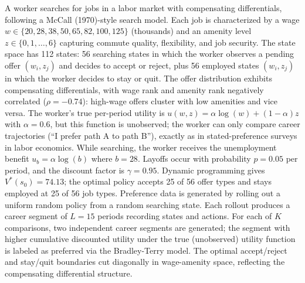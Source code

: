 A worker searches for jobs in a labor market with compensating differentials, following a McCall (1970)-style search model. Each job is characterized by a wage $w \in \{20, 28, 38, 50, 65, 82, 100, 125\}$ (thousands) and an amenity level $z \in \{0, 1, \ldots, 6\}$ capturing commute quality, flexibility, and job security. The state space has 112 states: 56 searching states in which the worker observes a pending offer $(w_i, z_j)$ and decides to accept or reject, plus 56 employed states $(w_i, z_j)$ in which the worker decides to stay or quit. The offer distribution exhibits compensating differentials, with wage rank and amenity rank negatively correlated ($\rho = -0.74$): high-wage offers cluster with low amenities and vice versa. The worker's true per-period utility is $u(w, z) = \alpha \log(w) + (1 - \alpha) z$ with $\alpha = 0.6$, but this function is unobserved; the worker can only compare career trajectories (``I prefer path A to path B''), exactly as in stated-preference surveys in labor economics. While searching, the worker receives the unemployment benefit $u_b = \alpha \log(b)$ where $b = 28$. Layoffs occur with probability $p = 0.05$ per period, and the discount factor is $\gamma = 0.95$. Dynamic programming gives $V^*(s_0) = 74.13$; the optimal policy accepts 25 of 56 offer types and stays employed at 25 of 56 job types. Preference data is generated by rolling out a uniform random policy from a random searching state. Each rollout produces a career segment of $L = 15$ periods recording states and actions. For each of $K$ comparisons, two independent career segments are generated; the segment with higher cumulative discounted utility under the true (unobserved) utility function is labeled as preferred via the Bradley-Terry model. The optimal accept/reject and stay/quit boundaries cut diagonally in wage-amenity space, reflecting the compensating differential structure.



